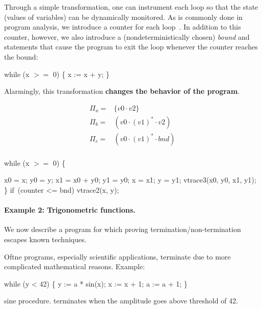 Through a simple transformation, one can instrument each loop
so that the state (values of variables) can be dynamically monitored.
%
As is commonly done in program analysis, we introduce a counter
for each loop~\cite{speed08}. In addition to this counter, however, 
we also introduce a (nondeterministically chosen) \emph{bound} and statements that 
cause the program to exit the loop whenever the counter reaches the bound:
\begin{center}
  \begin{program}[style=tt]
wh\tab ile (x $>=$ 0) \{
  x := x + y; \untab
\}
  \end{program}
\end{center}
Alarmingly, this transformation {\bf changes the behavior of the program}.


\[\begin{array}{ll}
\Pi_a =& \{ v0 \cdot v2 \}\\
\Pi_b =& (v0 \cdot (v1)^* \cdot v2)\\
\Pi_c =& (v0 \cdot (v1)^* \cdot bnd)\\
\end{array}\]





\begin{center}
  \begin{program}[style=tt]
wh\tab ile (x $>=$ 0) \{

  x0 = x;
  y0 = y;
  x1 = x0 + y0;
  y1 = y0;
  x = x1;
  y = y1;
  vtrace3(x0, y0, x1, y1);
\}
if\tab\ (counter <= bnd) 
  vtrace2(x, y);
  \end{program}
\end{center}



\paragraph{Example 2: Trigonometric functions.}
We now describe a program for which proving termination/non-termination 
escapes known techniques.

Oftne programs, especially scientific applications, terminate due to more complicated mathematical reasons. Example:
\begin{center}
  \begin{program}[style=tt]
    wh\tab ile (y < 42) \{
      y := a * sin(x);
      x := x + 1;
      a := a + 1; \untab
    \}
  \end{program}
\end{center}
sine procedure. terminates when the amplitude goes above threshold of 42.

